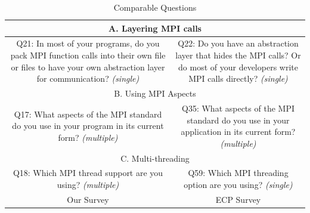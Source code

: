 \documentclass[conference,10pt,letterpaper]{IEEEtran}
\begin{document}
\begin{table}[htb]%
  \begin{center}%
    \caption{Comparable Questions}%
    \label{tab:comparable-questions}%
    \begin{tabular}[t]{c|c}
      \hline
      \multicolumn{2}{c}{A. Layering MPI calls} \\
      \hline
      \begin{minipage}[t]{0.45\hsize}
        Q21: In most of your programs, do you pack MPI function calls into
        their own file or files to have your own abstraction layer for
        communication?  {\it(single)}
      \end{minipage}
      &
      \begin{minipage}[t]{0.45\hsize}
        Q22: Do you have an abstraction layer that hides the MPI calls? Or do
        most of your developers write MPI calls directly? {\it(single)}
      \end{minipage}
      \\
      \hline
      \multicolumn{2}{c}{B. Using MPI Aspects} \\
      \hline
      \begin{minipage}[t]{0.45\hsize}
        Q17: What aspects of the MPI standard do you use in your program in its
        current form? {\it(multiple)}
      \end{minipage}
      &
      \begin{minipage}[t]{0.45\hsize}
        Q35: What aspects of the MPI standard do you use in your application in
        its current form? {\it(multiple)}
      \end{minipage}
      \\
      \hline
      \multicolumn{2}{c}{C. Multi-threading} \\
      \hline
      \begin{minipage}[t]{0.45\hsize}
        Q18: Which MPI thread support are you using? {\it(multiple)}
      \end{minipage}
      &
      \begin{minipage}[t]{0.45\hsize}
        Q59: Which MPI threading option are you using? {\it(single)}
      \end{minipage}
      \\
      \hline
      Our Survey & ECP Survey \\
      \hline
    \end{tabular}%
  \end{center}%
\end{table}%
\end{document}
